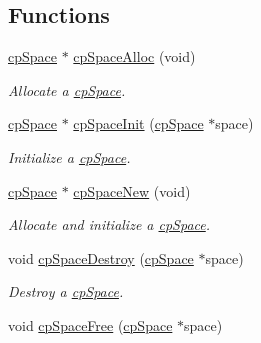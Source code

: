 \subsection*{Functions}
\begin{DoxyCompactItemize}
\item 
\hypertarget{group__cp_space_gaeed23237c8a7b052ec816b339c7e60dd}{\hyperlink{structcp_space}{cp\-Space} $\ast$ \hyperlink{group__cp_space_gaeed23237c8a7b052ec816b339c7e60dd}{cp\-Space\-Alloc} (void)}\label{group__cp_space_gaeed23237c8a7b052ec816b339c7e60dd}

\begin{DoxyCompactList}\small\item\em Allocate a \hyperlink{structcp_space}{cp\-Space}. \end{DoxyCompactList}\item 
\hypertarget{group__cp_space_ga3e668d762b5b6438b51f7af0fb32ff09}{\hyperlink{structcp_space}{cp\-Space} $\ast$ \hyperlink{group__cp_space_ga3e668d762b5b6438b51f7af0fb32ff09}{cp\-Space\-Init} (\hyperlink{structcp_space}{cp\-Space} $\ast$space)}\label{group__cp_space_ga3e668d762b5b6438b51f7af0fb32ff09}

\begin{DoxyCompactList}\small\item\em Initialize a \hyperlink{structcp_space}{cp\-Space}. \end{DoxyCompactList}\item 
\hypertarget{group__cp_space_gac6293d85ec533d496e3005d194c1e62b}{\hyperlink{structcp_space}{cp\-Space} $\ast$ \hyperlink{group__cp_space_gac6293d85ec533d496e3005d194c1e62b}{cp\-Space\-New} (void)}\label{group__cp_space_gac6293d85ec533d496e3005d194c1e62b}

\begin{DoxyCompactList}\small\item\em Allocate and initialize a \hyperlink{structcp_space}{cp\-Space}. \end{DoxyCompactList}\item 
\hypertarget{group__cp_space_ga964c2ec74cf2527fa17142b6009796c5}{void \hyperlink{group__cp_space_ga964c2ec74cf2527fa17142b6009796c5}{cp\-Space\-Destroy} (\hyperlink{structcp_space}{cp\-Space} $\ast$space)}\label{group__cp_space_ga964c2ec74cf2527fa17142b6009796c5}

\begin{DoxyCompactList}\small\item\em Destroy a \hyperlink{structcp_space}{cp\-Space}. \end{DoxyCompactList}\item 
\hypertarget{group__cp_space_ga1fe399459fcb74d30eb29a73af26cd0c}{void \hyperlink{group__cp_space_ga1fe399459fcb74d30eb29a73af26cd0c}{cp\-Space\-Free} (\hyperlink{structcp_space}{cp\-Space} $\ast$space)}\label{group__cp_space_ga1fe399459fcb74d30eb29a73af26cd0c}


\end{DoxyCompactItemize}
